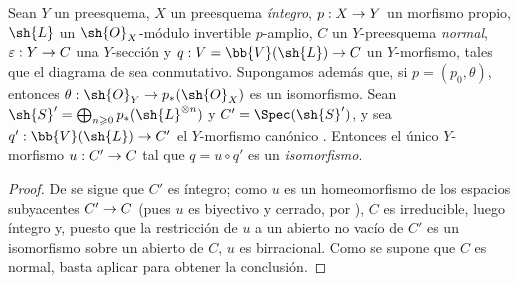 \documentclass[oneside,10pt]{amsart}
\makeatletter
\renewcommand{\geq}{\geqslant}
\newcommand{\ega@arrow}[2]{\mathchoice{#1}{#2}{#2}{#2}}
\renewcommand{\to}{\ega@arrow{\longrightarrow}{\rightarrow}}
\let\EGAOriginalLabel\label
\renewcommand{\label}[1]{\phantomsection\EGAOriginalLabel{#1}}
\makeatother
\begin{document}
\begin{proposition}[8.11.7]
\label{II.8.11.7}
Sean $Y$ un preesquema, $X$ un preesquema \emph{íntegro}, $p:X\to Y$ un morfismo propio, $\sh{L}$ un $\sh{O}_X$-módulo invertible $p$-amplio, $C$ un $Y$-preesquema \emph{normal}, $\varepsilon:Y\to C$ una $Y$-sección y $q:V=\bb{V}(\sh{L})\to C$ un $Y$-morfismo, tales que el diagrama de  sea conmutativo.
Supongamos además que, si $p=(p_0,\theta)$, entonces $\theta:\sh{O}_Y\to p_*(\sh{O}_X)$ es un isomorfismo.
Sean $\sh{S}'=\bigoplus_{n\geq0}p_*(\sh{L}^{\otimes n})$ y $C'=\Spec(\sh{S}')$, \textup{y} sea $q':\bb{V}(\sh{L})\to C'$ el $Y$-morfismo canónico .
Entonces el único $Y$-morfismo $u:C'\to C$ tal que $q=u\circ q'$ es un \emph{isomorfismo}.
\end{proposition}

\begin{proof}
De  se sigue que $C'$ es íntegro;
como $u$ es un homeomorfismo de los espacios subyacentes $C'\to C$ (pues $u$ es biyectivo y cerrado, por ), $C$ es irreducible, luego íntegro y, puesto que la restricción de $u$ a un abierto no vacío de $C'$ es un isomorfismo sobre un abierto de $C$, $u$ es birracional.
Como se supone que $C$ es normal, basta aplicar  para obtener la conclusión.
\end{proof}
\end{document}
